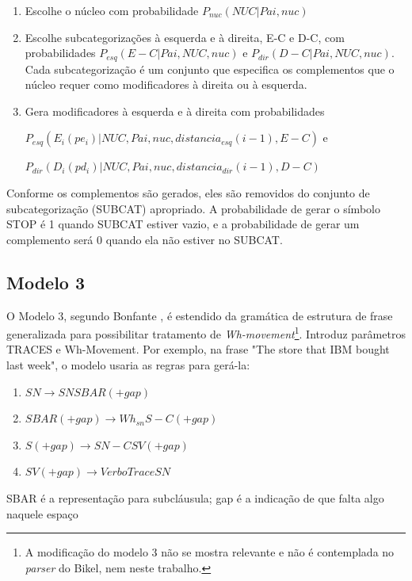 \begin{enumerate}
  \item Escolhe o núcleo com probabilidade $P_{nuc}(NUC|Pai, nuc)$
  \item Escolhe subcategorizações à esquerda e à direita, E-C e D-C, com probabilidades $P_{esq}(E-C|Pai,NUC, nuc)$ e $P_{dir}(D-C|Pai,NUC, nuc)$. Cada subcategorização é um conjunto que especifica os complementos que o núcleo requer como modificadores à direita ou à esquerda.
  \item Gera modificadores à esquerda e à direita com probabilidades

$P_{esq}(E_i(pe_i)|NUC, Pai, nuc, distancia_{esq}(i - 1),E - C)$ e

$P_{dir}(D_i(pd_i)|NUC, Pai, nuc, distancia_{dir}(i - 1),D - C)$

\end{enumerate}

Conforme os complementos são gerados, eles são removidos do conjunto de subcategorização (SUBCAT) apropriado. A probabilidade de gerar o símbolo STOP é 1 quando SUBCAT estiver vazio, e a probabilidade de gerar um complemento será 0 quando ela não estiver no SUBCAT.

\subsection{Modelo 3}
\label{sub:modelo3}


O Modelo 3, segundo Bonfante \cite{bonfante03}, é estendido da gramática de estrutura de frase generalizada para possibilitar tratamento de \emph{Wh-movement}\footnote{A modificação do modelo 3 não se mostra relevante e não é contemplada no \emph{parser} do Bikel, nem neste trabalho.}. Introduz parâmetros TRACES e Wh-Movement. Por exemplo, na frase "The store that IBM bought last week", o modelo usaria as regras para gerá-la:

\begin{enumerate}
  \item $SN \rightarrow SN SBAR(+gap)$
  \item $SBAR(+gap) \rightarrow Wh_{sn} S-C(+gap)$
  \item $S(+gap) \rightarrow SN-C SV(+gap)$
  \item $SV(+gap) \rightarrow Verbo Trace SN$
\end{enumerate}


SBAR é a representação para subcláusula; gap é a indicação de que falta algo naquele espaço


